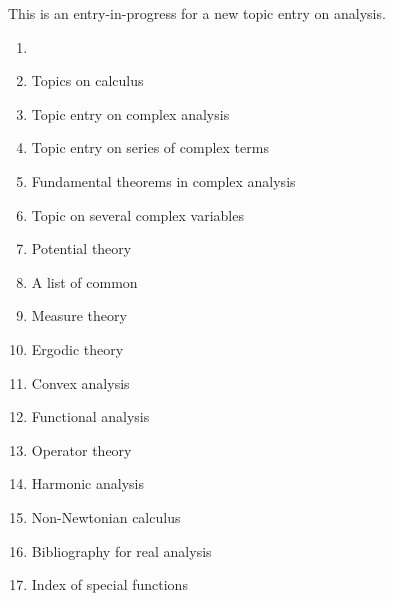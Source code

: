 \documentclass[12pt]{article}
\begin{document}
This is an entry-in-progress for a new topic entry on analysis.

\begin{enumerate}
\item {}
\item Topics on calculus
\item Topic entry on complex analysis
\item Topic entry on series of complex terms
\item Fundamental theorems in complex analysis
\item Topic on several complex variables
\item Potential theory
\item A list of common 
\item Measure theory
\item Ergodic theory
\item Convex analysis
\item Functional analysis
\item Operator theory
\item Harmonic analysis
\item Non-Newtonian calculus
\item Bibliography for real analysis
\item Index of special functions
\end{enumerate}


\end{document}
